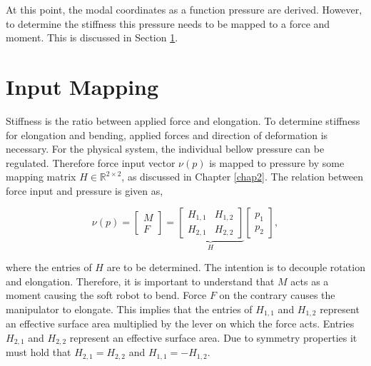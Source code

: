 At this point, the modal coordinates as a function pressure are derived. However, to determine the stiffness this pressure needs to be mapped to a force and moment. This is discussed in Section \ref{sec3:InputMapping}.






\section{Input Mapping}
\label{sec3:InputMapping}

Stiffness is the ratio between applied force and elongation. To determine stiffness for elongation and bending, applied forces and direction of deformation is necessary. For the physical system, the individual bellow pressure can be regulated. Therefore force input vector $\nu(p)$ is mapped to pressure by some mapping matrix $H \in \mathbb{R}^{2 \times 2}$, as discussed in Chapter \ref{chap2}. The relation between force input and pressure is given as, 

\begin{equation}
   \nu(p) =   \begin{bmatrix} M \\ F \end{bmatrix}     = \underbrace{\begin{bmatrix}  H_{1,1} & H_{1,2} \\ H_{2,1} & H_{2,2} \end{bmatrix}}_{H}         \begin{bmatrix}  p_1 \\ p_2 \end{bmatrix}, \label{eq3:H}
\end{equation}

where the entries of $H$ are to be determined. The intention is to decouple rotation and elongation. Therefore, it is important to understand that $M$ acts as a moment causing the soft robot to bend. Force $F$ on the contrary causes the manipulator to elongate. This implies that the entries of $H_{1,1}$ and $H_{1,2}$ represent an effective surface area multiplied by the lever on which the force acts. Entries $H_{2,1}$ and $H_{2,2}$ represent an effective surface area. Due to symmetry properties it must hold that $H_{2,1} = H_{2,2}$ and $H_{1,1} = -H_{1,2}$.

